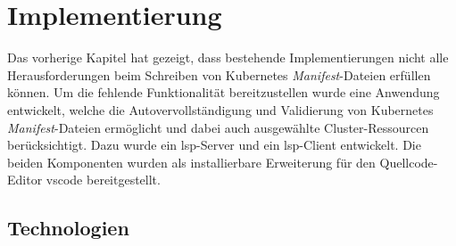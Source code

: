 \chapter{Implementierung}\label{ch:implementation}

Das vorherige Kapitel hat gezeigt, dass bestehende Implementierungen nicht alle Herausforderungen beim Schreiben von Kubernetes \textit{Manifest}-Dateien erfüllen
können. Um die fehlende Funktionalität bereitzustellen wurde eine Anwendung entwickelt,
welche die Autovervollständigung und Validierung von Kubernetes \textit{Manifest}-Dateien ermöglicht und dabei auch ausgewählte
Cluster-Ressourcen berücksichtigt. Dazu wurde ein \ac{lsp}-Server und ein \ac{lsp}-Client entwickelt.
Die beiden Komponenten wurden als installierbare Erweiterung für den Quellcode-Editor \ac{vscode} bereitgestellt.

\section{Technologien}

